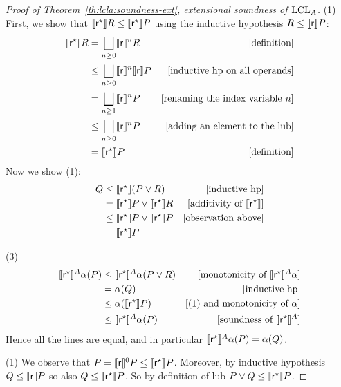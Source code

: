 \begin{proof}[Proof of Theorem~\ref{th:lcla:soundness-ext}, extensional soundness of $\text{LCL}_A$]
	\noindent (1) First, we show that $\llbracket\mathsf{r}^{\star}\rrbracket R \le \llbracket\mathsf{r}^{\star}\rrbracket P$ using the inductive hypothesis $R \le \llbracket\mathsf{r}\rrbracket P$:
	\begin{align*}
		\llbracket\mathsf{r}^{\star}\rrbracket R &= \bigsqcup_{n \ge 0} \llbracket\mathsf{r}\rrbracket^n R &[\text{definition}] \\
		&\le \bigsqcup_{n \ge 0} \llbracket\mathsf{r}\rrbracket^n \llbracket\mathsf{r}\rrbracket P &[\text{inductive hp on all operands}] \\
		&= \bigsqcup_{n \ge 1} \llbracket\mathsf{r}\rrbracket^n P &[\text{renaming the index variable }n] \\
		&\le \bigsqcup_{n \ge 0} \llbracket\mathsf{r}\rrbracket^n P &[\text{adding an element to the lub}] \\
		&= \llbracket\mathsf{r}^{\star}\rrbracket P &[\text{definition}]
	\end{align*}
	Now we show (1):
	\begin{align*}
		Q &\le \llbracket\mathsf{r}^{\star}\rrbracket (P \lor R) &[\text{inductive hp}] \\
		&= \llbracket\mathsf{r}^{\star}\rrbracket P \lor \llbracket\mathsf{r}^{\star}\rrbracket R &[\text{additivity of }\llbracket\mathsf{r}^{\star}\rrbracket] \\
		&\le \llbracket\mathsf{r}^{\star}\rrbracket P \lor \llbracket\mathsf{r}^{\star}\rrbracket P &[\text{observation above}] \\
		&= \llbracket\mathsf{r}^{\star}\rrbracket P
	\end{align*}
	
	\noindent (3)
	\begin{align*}
		\llbracket\mathsf{r}^{\star}\rrbracket^{A} \alpha(P) &\le \llbracket\mathsf{r}^{\star}\rrbracket^{A} \alpha(P \lor R) &[\text{monotonicity of }\llbracket\mathsf{r}^{\star}\rrbracket^{A} \alpha] \\
		&= \alpha(Q) &[\text{inductive hp}] \\
		&\le \alpha(\llbracket\mathsf{r}^{\star}\rrbracket P) &[\text{(1) and monotonicity of }\alpha] \\
		&\le \llbracket\mathsf{r}^{\star}\rrbracket^{A} \alpha(P) &[\text{soundness of }\llbracket\mathsf{r}^{\star}\rrbracket^{A}]
	\end{align*}
	Hence all the lines are equal, and in particular $\llbracket\mathsf{r}^{\star}\rrbracket^{A} \alpha(P) = \alpha(Q)$.
	
	\noindent (1) We observe that $P = \llbracket\mathsf{r}\rrbracket^0 P \le \llbracket\mathsf{r}^{\star}\rrbracket P$. Moreover, by inductive hypothesis $Q \le \llbracket\mathsf{r}\rrbracket P$ so also $Q \le \llbracket\mathsf{r}^{\star}\rrbracket P$. So by definition of lub $P \lor Q \le \llbracket\mathsf{r}^{\star}\rrbracket P$.
	

\end{proof}
